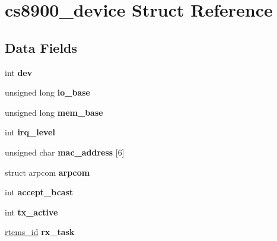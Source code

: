 \hypertarget{structcs8900__device}{}\section{cs8900\+\_\+device Struct Reference}
\label{structcs8900__device}
\subsection*{Data Fields}
\begin{DoxyCompactItemize}
\item 
\mbox{\label{structcs8900__device_a0560e59cd4a0a4416c83121b58576d55}} 
int {\bfseries dev}
\item 
\mbox{\label{structcs8900__device_a489371d859fb1e0e5b16568c9449a14c}} 
unsigned long {\bfseries io\+\_\+base}
\item 
\mbox{\label{structcs8900__device_aacfb9f3efef99296997e968abeb9921b}} 
unsigned long {\bfseries mem\+\_\+base}
\item 
\mbox{\label{structcs8900__device_a7f7c312eaf836b9e729abfaf1e09bf4b}} 
int {\bfseries irq\+\_\+level}
\item 
\mbox{\label{structcs8900__device_af3b0da35f24b2fb7d590c82f1ad8abb6}} 
unsigned char {\bfseries mac\+\_\+address} \mbox{[}6\mbox{]}
\item 
\mbox{\label{structcs8900__device_a7bc792c1c69e4499690e355da4a85cc5}} 
struct arpcom {\bfseries arpcom}
\item 
\mbox{\label{structcs8900__device_ac119ea2f92aaca0417d8007cc0df654e}} 
int {\bfseries accept\+\_\+bcast}
\item 
\mbox{\label{structcs8900__device_a5260c8fbc339fe71bd10fd60b6362a0a}} 
int {\bfseries tx\+\_\+active}
\item 
\mbox{\label{structcs8900__device_a446044d1916ffc5a4b6a2705eb49945e}} 
\mbox{\hyperlink{group__ClassicTasks_gab20892b814dced7dd4e5b9bf42becd57}{rtems\+\_\+id}} {\bfseries rx\+\_\+task}

\end{DoxyCompactItemize}
